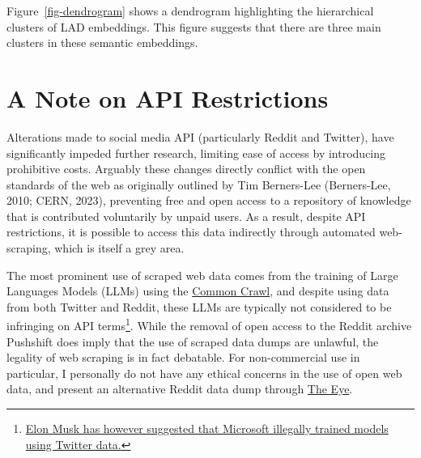 \documentclass[
  letterpaper,
  11pt,
  english,
  onehalfspacing,
  headsepline]{MastersDoctoralThesis}
\begin{document}
Figure~\ref{fig-dendrogram} shows a dendrogram highlighting the
hierarchical clusters of LAD embeddings. This figure suggests that there
are three main clusters in these semantic embeddings.

\hypertarget{a-note-on-api-restrictions}{%
\chapter{A Note on API Restrictions}\label{a-note-on-api-restrictions}}

Alterations made to social media API (particularly Reddit and Twitter),
have significantly impeded further research, limiting ease of access by
introducing prohibitive costs. Arguably these changes directly conflict
with the open standards of the web as originally outlined by Tim
Berners-Lee (Berners-Lee, 2010; CERN, 2023), preventing free and open
access to a repository of knowledge that is contributed voluntarily by
unpaid users. As a result, despite API restrictions, it is possible to
access this data indirectly through automated web-scraping, which is
itself a grey area.

The most prominent use of scraped web data comes from the training of
Large Languages Models (LLMs) using the
\href{https://index.commoncrawl.org}{Common Crawl}, and despite using
data from both Twitter and Reddit, these LLMs are typically not
considered to be infringing on API terms\footnote{\href{https://twitter.com/elonmusk/status/1648784955655192577}{Elon
  Musk has however suggested that Microsoft illegally trained models
  using Twitter data.}}. While the removal of open access to the Reddit
archive Pushshift does imply that the use of scraped data dumps are
unlawful, the legality of web scraping is in fact debatable. For
non-commercial use in particular, I personally do not have any ethical
concerns in the use of open web data, and present an alternative Reddit
data dump through \href{https://the-eye.eu/redarcs/}{The Eye}.
\end{document}
